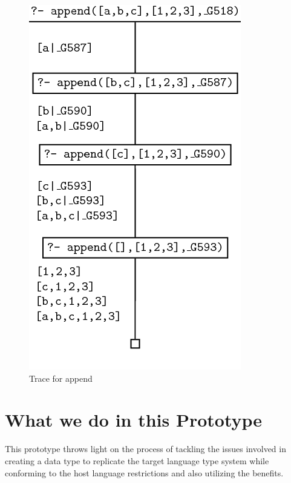 \documentclass[thesis-solanki.tex]{subfiles}
\begin{document}
\begin{figure}[h]
\centering
\includegraphics[scale = 0.5]{PrologAppendWorking.png}
\caption{Trace for append \cite{webiste:learnprolognowappend}}
\label{fig:Trace for append}
\end{figure}  

\section{What we do in this Prototype}
This prototype throws light on the process of tackling the issues involved in creating 
a data type to replicate the target language type system while conforming to the host language restrictions and also utilizing the 
benefits. 
\end{document}
